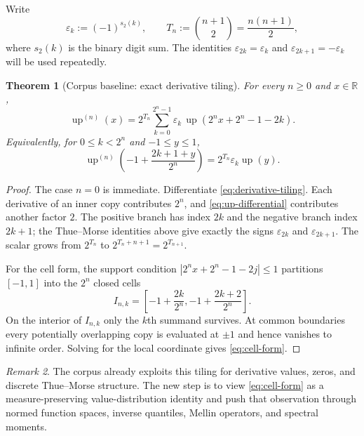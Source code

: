 \documentclass[11pt,oneside]{article}
\numberwithin{equation}{section}
\theoremstyle{plain}
\newtheorem{theorem}{Theorem}[section]
\theoremstyle{definition}
\theoremstyle{remark}
\newtheorem{remark}[theorem]{Remark}
\newcommand{\R}{\mathbb R}
\newcommand{\Up}{\operatorname{up}}
\begin{document}
Write
\begin{equation}
 \varepsilon_k:=(-1)^{s_2(k)},\qquad
 T_n:=\binom{n+1}{2}=\frac{n(n+1)}2,
 \label{eq:epsilon-Tn}
\end{equation}
where $s_2(k)$ is the binary digit sum.  The identities
$\varepsilon_{2k}=\varepsilon_k$ and
$\varepsilon_{2k+1}=-\varepsilon_k$ will be used repeatedly.

\begin{theorem}[Corpus baseline: exact derivative tiling]
\label{thm:derivative-tiling}
For every $n\geq0$ and $x\in\R$,
\begin{equation}
 \boxed{
 \Up^{(n)}(x)=2^{T_n}
 \sum_{k=0}^{2^n-1}\varepsilon_k\,
 \Up\!\left(2^n x+2^n-1-2k\right).}
 \label{eq:derivative-tiling}
\end{equation}
Equivalently, for $0\leq k<2^n$ and $-1\leq y\leq1$,
\begin{equation}
 \boxed{
 \Up^{(n)}\!\left(-1+\frac{2k+1+y}{2^n}\right)
 =2^{T_n}\varepsilon_k\Up(y).}
 \label{eq:cell-form}
\end{equation}
\end{theorem}

\begin{proof}
The case $n=0$ is immediate.  Differentiate \eqref{eq:derivative-tiling}.  Each derivative
of an inner copy contributes $2^n$, and \eqref{eq:up-differential} contributes another
factor $2$.  The positive branch has index $2k$ and the negative branch index $2k+1$;
the Thue--Morse identities above give exactly the signs $\varepsilon_{2k}$ and
$\varepsilon_{2k+1}$.  The scalar grows from $2^{T_n}$ to
$2^{T_n+n+1}=2^{T_{n+1}}$.

For the cell form, the support condition
$|2^nx+2^n-1-2j|\leq1$ partitions $[-1,1]$ into the $2^n$ closed cells
\[
 I_{n,k}=\left[-1+\frac{2k}{2^n},-1+\frac{2k+2}{2^n}\right].
\]
On the interior of $I_{n,k}$ only the $k$th summand survives.  At common boundaries every
potentially overlapping copy is evaluated at $\pm1$ and hence vanishes to infinite order.
Solving for the local coordinate gives \eqref{eq:cell-form}.
\end{proof}

\begin{remark}
The corpus already exploits this tiling for derivative values, zeros, and discrete
Thue--Morse structure.  The new step is to view \eqref{eq:cell-form} as a
measure-preserving value-distribution identity and push that observation through normed
function spaces, inverse quantiles, Mellin operators, and spectral moments.
\end{remark}
\end{document}
